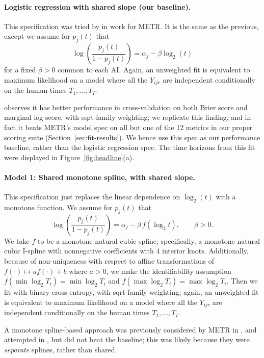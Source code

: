 \documentclass{article}
\theoremstyle{definition}
\begin{document}
\paragraph{Logistic regression with shared slope (our baseline).} This specification was tried by \citet{ImpactModellingAssumptions2026} in work for METR. It is the same as the previous, except we assume for $p_j(t)$ that
\[
    \log\left(
      \frac{p_j(t)}{1-p_j(t)}
    \right)  = \alpha_j - \beta \log_2(t)
\]
for a fixed $\beta > 0$ common to each AI. Again, an unweighted fit is equivalent to maximum likelihood on a model where all the $Y_{ijr}$ are independent conditionally on the human times $T_1, \dots, T_I$. 

\citet{ImpactModellingAssumptions2026} observes it has better performance in cross-validation on both Brier score and marginal log score, with sqrt-family weighting; we replicate this finding, and in fact it beats METR's model spec on all but one of the 12 metrics in our proper scoring suite (Section~\ref{sec:fit-results}). We hence use this spec as our performance baseline, rather than the logistic regression spec. The time horizons from this fit were displayed in Figure~\ref{fig:headline}(a). 

\paragraph{Model 1: Shared monotone spline, with shared slope.} This specification just replaces the linear dependence on $\log_2(t)$ with a monotone function. We assume for $p_j(t)$ that 
\[
    \log\left(
      \frac{p_j(t)}{1-p_j(t)}
    \right) = \alpha_j - \beta\, f(\log_2 t), \qquad \beta > 0.
\]
We take $f$ to be a monotone natural cubic spline; specifically, a monotone natural cubic I-spline with nonnegative coefficients with 4 interior knots. Additionally, because of non-uniqueness with respect to affine transformations of $f(\cdot) \mapsto a f(\cdot) + b$ where $a > 0$, we make the identifiability assumption $f(\min \log_2 T_i) = \min \log_2 T_i$ and $f(\max \log_2 T_i) = \max \log_2 T_i$. Then we fit with binary cross entropy, with sqrt-family weighting; again, an unweighted fit is equivalent to maximum likelihood on a model where all the $Y_{ijr}$ are independent conditionally on the human times $T_1, \dots, T_I$.

A monotone spline-based approach was previously considered by METR in \citet{ClarifyingLimitationsTime2026}, and attempted in \citet{ImpactModellingAssumptions2026}, but did not beat the baseline; this was likely because they were \emph{separate} splines, rather than shared. 
\end{document}
